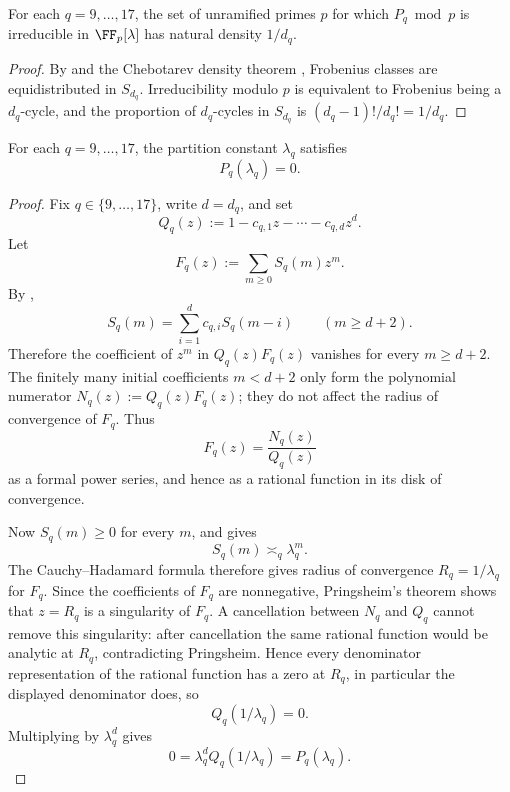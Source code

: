 \begin{corollary}
\label{cor:individual-chebotarev}
For each \(q=9,\dots,17\), the set of unramified primes \(p\) for which
\(P_q\bmod p\) is irreducible in \(\FF_p[\lambda]\) has natural density
\(1/d_q\).
\end{corollary}

\begin{proof}
By  and the Chebotarev density theorem
\cite{Neukirch1999}, Frobenius classes are equidistributed in \(S_{d_q}\).
Irreducibility modulo \(p\) is equivalent to Frobenius being a
\(d_q\)-cycle, and the proportion of \(d_q\)-cycles in \(S_{d_q}\) is
\((d_q-1)!/d_q!=1/d_q\).
\end{proof}

\begin{lemma}
\label{lem:lambda-root-certified-polynomial}
For each \(q=9,\dots,17\), the partition constant \(\lambda_q\) satisfies
\[
  P_q(\lambda_q)=0.
\]
\end{lemma}

\begin{proof}
Fix \(q\in\{9,\dots,17\}\), write \(d=d_q\), and set
\[
  Q_q(z):=1-c_{q,1}z-\cdots-c_{q,d}z^d.
\]
Let
\[
  F_q(z):=\sum_{m\ge0} S_q(m)z^m.
\]
By ,
\[
  S_q(m)=\sum_{i=1}^d c_{q,i}S_q(m-i)
  \qquad(m\ge d+2).
\]
Therefore the coefficient of \(z^m\) in \(Q_q(z)F_q(z)\) vanishes for every
\(m\ge d+2\).  The finitely many initial coefficients \(m<d+2\) only form the
polynomial numerator \(N_q(z):=Q_q(z)F_q(z)\); they do not affect the radius of
convergence of \(F_q\).  Thus
\[
  F_q(z)=\frac{N_q(z)}{Q_q(z)}
\]
as a formal power series, and hence as a rational function in its disk of
convergence.

Now \(S_q(m)\ge0\) for every \(m\), and  gives
\[
  S_q(m)\asymp_q \lambda_q^m.
\]
The Cauchy--Hadamard formula therefore gives radius of convergence
\(R_q=1/\lambda_q\) for \(F_q\).  Since the coefficients of \(F_q\) are
nonnegative, Pringsheim's theorem
\cite[Thm.~IV.6]{FlajoletSedgewick2009} shows that \(z=R_q\) is a singularity
of \(F_q\).  A cancellation between \(N_q\) and \(Q_q\) cannot remove this
singularity: after cancellation the same rational function would be analytic at
\(R_q\), contradicting Pringsheim.  Hence every denominator representation of
the rational function has a zero at \(R_q\), in particular the displayed
denominator does, so
\[
  Q_q(1/\lambda_q)=0.
\]
Multiplying by \(\lambda_q^d\) gives
\[
  0=\lambda_q^dQ_q(1/\lambda_q)=P_q(\lambda_q).
\]
\end{proof}

